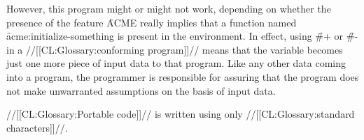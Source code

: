 However, this program might or might not work, depending on whether the
presence of the feature \f{ACME} really implies that a function named
\f{acme:initialize-something} is present in the environment.  In effect,
using \f{\#+} or \f{\#-} in a //[[CL:Glossary:conforming program]]// means that the variable
becomes just one more piece of input data to that 
program.  Like any other data coming into a program, the programmer
is responsible for assuring that the program does not make unwarranted
assumptions on the basis of input data.

\endsubsubsubsection%

\endsubsubsection%


//[[CL:Glossary:Portable code]]// is written using only //[[CL:Glossary:standard characters]]//.

\endsubsubsection%

\endsubSection%
